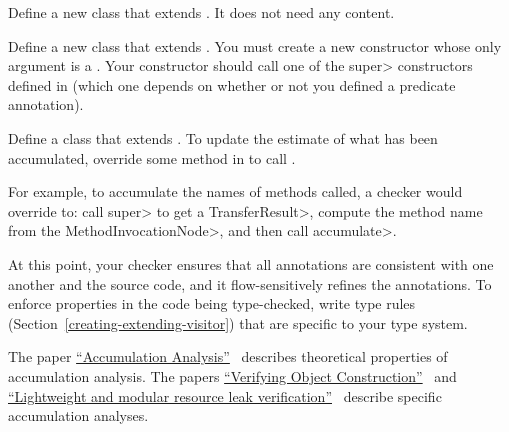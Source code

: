 
Define a new class that extends .
It does not need any content.

Define a new class that extends .
You must create a new constructor whose only argument is a .
Your constructor should call one of the \<super> constructors defined in
 (which one depends on whether or not
you defined a predicate annotation).



Define a class that extends .
To update the estimate of what has been accumulated, override some method in
 to call
.

For example, to accumulate the names of methods called, a checker would override
 to:
call \<super> to get a \<TransferResult>, compute the method name from the \<MethodInvocationNode>,
and then call \<accumulate>.



At this point, your checker ensures that all annotations are consistent
with one another and the source code, and it flow-sensitively refines the
annotations.
To enforce properties in the code being type-checked, write type rules
(Section~\ref{creating-extending-visitor}) that are specific to your type
system.



The paper
\href{https://homes.cs.washington.edu/~mernst/pubs/accumulation-analysis-ecoop2022.pdf}{``Accumulation
  Analysis''}~\cite{KelloggSSE2022} describes theoretical properties of
accumulation analysis.  The papers
\href{https://homes.cs.washington.edu/~mernst/pubs/object-construction-icse2020.pdf}{``Verifying
  Object Construction''}~\cite{KelloggRSSE2020} and
\href{https://homes.cs.washington.edu/~mernst/pubs/resource-leak-esecfse2021.pdf}{``Lightweight
  and modular resource leak verification''}~\cite{KelloggSSE2021} describe
specific accumulation analyses.


